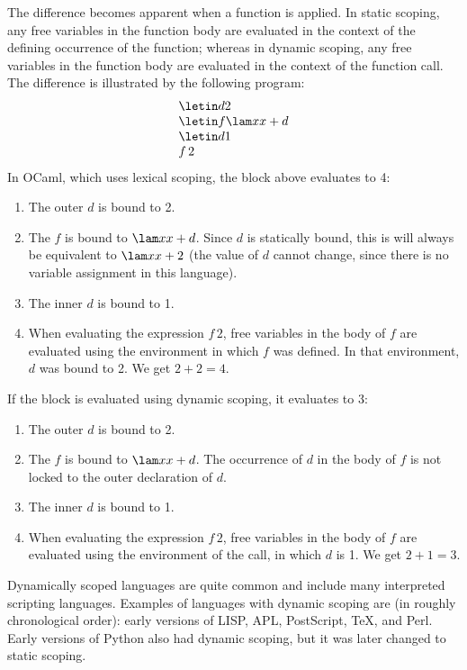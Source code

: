 The difference becomes apparent when a function is applied.  In static
scoping, any free variables in the function body are evaluated in the
context of the defining occurrence of the function; whereas in dynamic
scoping, any free variables in the function body are evaluated in the
context of the function call.  The difference is illustrated by the
following program:
\[
\begin{array}l
\letin d2{}\\
\letin f{\lam x{x+d}}{}\\
\letin d1{}\\
f\,2
\end{array}
\]
In OCaml, which uses lexical scoping, the block above evaluates to 4:
\begin{enumerate}
\item The outer $d$ is bound to 2.
\item The $f$ is bound to $\lam x{x+d}$.  Since $d$ is statically bound, this is will always be equivalent to $\lam x{x+2}$ (the value of $d$ cannot change, since there is no variable assignment in this language).
\item The inner $d$ is bound to 1.
\item When evaluating the expression $f\,2$, free variables in the body of $f$ are evaluated using the environment in which $f$ was defined.  In that environment, $d$ was bound to 2.  We get $2+2=4$.
\end{enumerate}
If the block is evaluated using dynamic scoping, it evaluates to 3:
\begin{enumerate}
\item The outer $d$ is bound to 2.
\item The $f$ is bound to $\lam x{x+d}$.  The occurrence of $d$ in the body of $f$ is not locked to the outer declaration of $d$.
\item The inner $d$ is bound to 1.
\item When evaluating the expression $f\,2$, free variables in the body of $f$ are evaluated using the environment of the call, in which $d$ is 1.  We get $2 + 1 = 3$.
\end{enumerate}

Dynamically scoped languages are quite common and include many
interpreted scripting languages.  Examples of languages with dynamic
scoping are (in roughly chronological order): early versions of LISP,
APL, PostScript, TeX, and Perl.  Early versions of Python also had
dynamic scoping, but it was later changed to static scoping.

